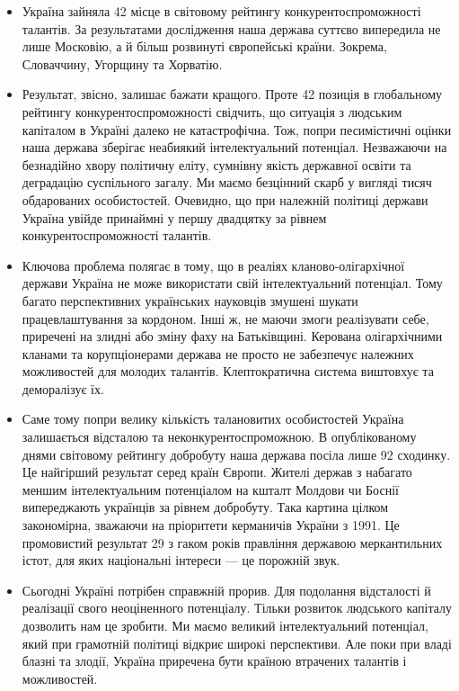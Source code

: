 \begin{itemize}
\item Україна зайняла 42 місце в світовому рейтингу конкурентоспроможності
				талантів. За результатами дослідження наша держава суттєво випередила
				не лише Московію, а й більш розвинуті європейські країни. Зокрема,
				Словаччину, Угорщину та Хорватію.  

\item Результат, звісно, залишає бажати кращого. Проте 42 позиція в глобальному
				рейтингу конкурентоспроможності свідчить, що ситуація з людським
				капіталом в Україні далеко не катастрофічна. Тож, попри песимістичні
				оцінки наша держава зберігає неабиякий інтелектуальний потенціал.
				Незважаючи на безнадійно хвору політичну еліту, сумнівну якість
				державної освіти та деградацію суспільного загалу. Ми маємо безцінний
				скарб у вигляді тисяч обдарованих особистостей. Очевидно, що при
				належній політиці держави Україна  увійде принаймні у першу двадцятку
				за рівнем конкурентоспроможності талантів.

\item Ключова проблема полягає в тому, що в реаліях кланово-олігархічної
				держави Україна не може використати свій інтелектуальний потенціал.
				Тому багато перспективних  українських науковців змушені шукати
				працевлаштування за кордоном. Інші ж, не маючи змоги реалізувати себе,
				приречені на злидні або зміну фаху на Батьківщині. Керована
				олігархічними кланами та корупціонерами держава не просто не забезпечує
				належних можливостей для молодих талантів. Клептократична система
				виштовхує та деморалізує їх.

\item Саме тому попри велику кількість талановитих особистостей Україна
				залишається відсталою та неконкурентоспроможною. В опублікованому днями
				світовому рейтингу добробуту наша держава посіла лише 92 сходинку. Це
				найгірший результат серед країн Європи. Жителі держав з набагато меншим
				інтелектуальним потенціалом на кшталт Молдови чи Боснії випереджають
				українців за рівнем добробуту. Така картина цілком закономірна,
				зважаючи на пріоритети керманичів України з 1991. Це промовистий
				результат 29 з гаком років правління державою меркантильних істот, для
				яких національні інтереси --- це порожній звук. 

\item Сьогодні Україні потрібен справжній прорив. Для подолання відсталості й
				реалізації свого неоціненного потенціалу. Тільки розвиток людського
				капіталу дозволить нам це зробити. Ми маємо великий інтелектуальний
				потенціал, який при грамотній політиці відкриє широкі перспективи. Але
				поки при владі блазні та злодії, Україна приречена бути країною
				втрачених талантів і можливостей.
\end{itemize}
